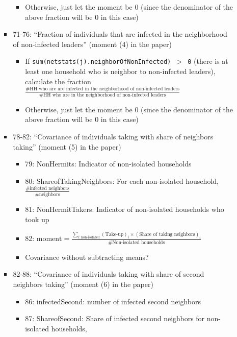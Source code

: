 \documentclass[10pt,letterpaper]{article}
\begin{document}
\begin{itemize}
\begin{itemize}
\begin{itemize}
\begin{itemize}
              \item Otherwise, just let the moment be $0$ (since the denominator of the above fraction will be $0$ in this case)
            \end{itemize}
          \item 71-76: ``Fraction of individuals that are infected in the neighborhood of non-infected leaders'' (moment (4) in the paper)
            \begin{itemize}
              \item If \texttt{sum(netstats(j).neighborOfNonInfected) $>$ 0} (there is at least one household who is neighbor to non-infected leaders), calculate the fraction \\ $\frac{\text{\# HH who are are infected in the neighborhood of non-infected leaders}}{\text{\# HH who are in the neighborhood of non-infected leaders}}$
              \item Otherwise, just let the moment be $0$ (since the denominator of the above fraction will be $0$ in this case)
            \end{itemize}
          \item 78-82: ``Covariance of individuals taking with share of neighbors taking'' (moment (5) in the paper)
            \begin{itemize}
              \item 79: NonHermits: Indicator of non-isolated households 
              \item 80: ShareofTakingNeighbors: For each non-isolated household, \\
                $\frac{\text{\# infected neighbors}}{\text{\# neighbors}}$
              \item 81: NonHermitTakers: Indicator of non-isolated households who took up
              \item 82: $\text{moment} = \frac{\sum_{i: \text{non-isolated}} (\text{Take-up})_i \times (\text{Share of taking neighbors})_i}{\text{\# Non-isolated households}}$
              \item Covariance without subtracting means?
            \end{itemize}
          \item 82-88: ``Covariance of individuals taking with share of second neighbors taking'' (moment (6) in the paper)
            \begin{itemize}
              \item 86: infectedSecond: number of infected second neighbors
              \item 87: ShareofSecond: Share of infected second neighbors for non-isolated households, \\

\end{itemize}
\end{itemize}
\end{itemize}
\end{itemize}
\end{document}
